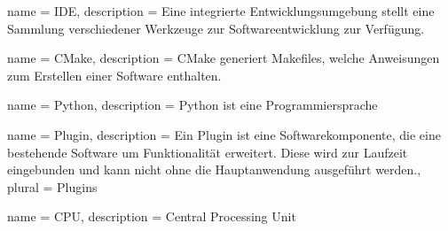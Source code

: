  {
    name = {IDE},
    description = {Eine integrierte Entwicklungsumgebung stellt eine Sammlung verschiedener Werkzeuge zur Softwareentwicklung zur Verfügung.}
}

 {
    name = {CMake},
    description = {CMake generiert Makefiles, welche Anweisungen zum Erstellen einer Software enthalten.}
}

 {
    name = {Python},
    description = {Python ist eine Programmiersprache}
}

 {
    name = {Plugin},
    description = {Ein Plugin ist eine Softwarekomponente, die eine bestehende Software um Funktionalität erweitert.
                   Diese wird zur Laufzeit eingebunden und kann nicht ohne die Hauptanwendung ausgeführt werden.},
    plural = {Plugins}
}

 {
    name = {CPU},
    description = {Central Processing Unit}
}
